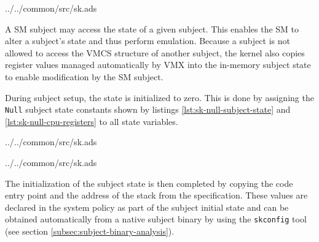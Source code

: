 
	{../../common/src/sk.ads}

A SM subject may access the state of a given subject. This enables
the SM to alter a subject's state and thus perform emulation. Because a subject
is not allowed to access the VMCS structure of another subject, the kernel also
copies register values managed automatically by VMX into the
in-memory subject state to enable modification by the SM subject.

During subject setup, the state is initialized to zero. This is done by
assigning the \texttt{Null} subject state constants shown by listings
\ref{lst:sk-null-subject-state} and \ref{lst:sk-null-cpu-registers} to all
state variables.


	{../../common/src/sk.ads}


	{../../common/src/sk.ads}

The initialization of the subject state is then completed by copying the code
entry point and the address of the stack from the specification.  These values
are declared in the system policy as part of the subject initial state and can
be obtained automatically from a native subject binary by using the
\texttt{skconfig} tool (see section \ref{subsec:subject-binary-analysis}).
